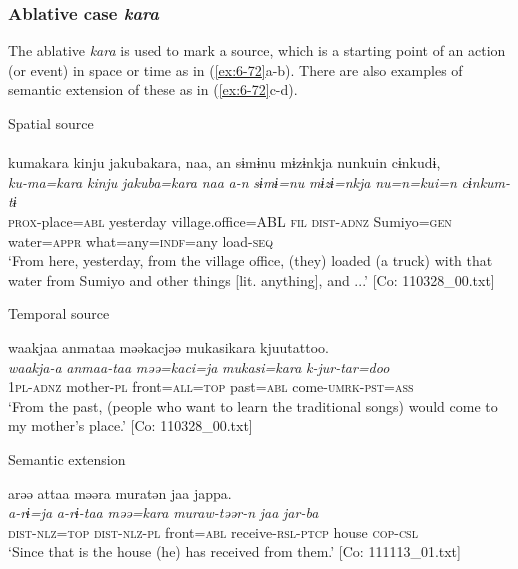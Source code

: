 \subsubsection{ Ablative case \textit{kara}}

The ablative \textit{kara} is used to mark a source, which is a starting point of an action (or event) in space or time as in (\ref{ex:6-72}a-b). There are also examples of semantic extension of these as in (\ref{ex:6-72}c-d).

\ea\label{ex:6-72}
 Spatial source\\

 \ea{}\\
{\TM}
\glll  kumakara  kinju  jakubakara,  naa,  an   sɨmɨnu  mɨzɨnkja  nunkuin  cɨnkudɨ,\\
\textit{ku-ma=kara}  \textit{kinju}  \textit{jakuba=kara}  \textit{naa}  \textit{a-n}   \textit{sɨmɨ=nu}  \textit{mɨzɨ=nkja}  \textit{nu=n=kui=n}  \textit{cɨnkum-tɨ}\\
\textsc{prox}-place=\textsc{abl}  yesterday  village.office=ABL  \textsc{fil}  \textsc{dist}-\textsc{adnz} Sumiyo=\textsc{gen}  water=\textsc{appr}  what=any=\textsc{indf}=any  load-\textsc{seq}\\
\glt ‘From here, yesterday, from the village office, (they) loaded (a truck) with that water from Sumiyo and other things [lit. anything], and ...’ [Co: 110328\_00.txt]

  Temporal source

\ex
{\TM}
\glll waakjaa  anmataa  məəkacjəə  mukasikara kjuutattoo.\\
\textit{waakja-a}  \textit{anmaa-taa}  \textit{məə=kaci=ja}  \textit{mukasi=kara}  \textit{k-jur-tar=doo}\\
1\textsc{pl}-\textsc{adnz}  mother-\textsc{pl}  front=\textsc{all}=\textsc{top}  past=\textsc{abl}  come-\textsc{umrk}-\textsc{pst}=\textsc{ass}\\
\glt ‘From the past, (people who want to learn the traditional songs) would come to my mother’s place.’ [Co: 110328\_00.txt]

  Semantic extension

\ex
{\TM}
\glll arəə  attaa  məəra  muratən  jaa    jappa.\\
\textit{a-rɨ=ja}  \textit{a-rɨ-taa}  \textit{məə=kara}  \textit{muraw-təər-n}  \textit{jaa}    \textit{jar-ba}\\
\textsc{dist}-\textsc{nlz}=\textsc{top}  \textsc{dist}-\textsc{nlz}-\textsc{pl}  front=\textsc{abl}  receive-\textsc{rsl}-\textsc{ptcp}  house \textsc{cop}-\textsc{csl}\\
\glt ‘Since that is the house (he) has received from them.’ [Co: 111113\_01.txt]

